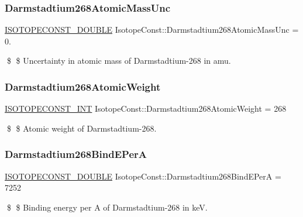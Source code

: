 \subsubsection{\texorpdfstring{Darmstadtium268\+Atomic\+Mass\+Unc}{Darmstadtium268AtomicMassUnc}}
{\footnotesize\ttfamily \mbox{\hyperlink{group___isotope_const-_macros_ga8f45a7272ce02c0b4c65c44636ed719a}{I\+S\+O\+T\+O\+P\+E\+C\+O\+N\+S\+T\+\_\+\+D\+O\+U\+B\+LE}} Isotope\+Const\+::\+Darmstadtium268\+Atomic\+Mass\+Unc = 0.}

\$ \$ Uncertainty in atomic mass of Darmstadtium-\/268 in amu. \mbox{\label{group___isotope_const-_darmstadtium-_ds268_gad6aab6288136e6340f53a201def37b15}} 
\subsubsection{\texorpdfstring{Darmstadtium268\+Atomic\+Weight}{Darmstadtium268AtomicWeight}}
{\footnotesize\ttfamily \mbox{\hyperlink{group___isotope_const-_macros_ga5f18360b3e99483a35c32d789e62621c}{I\+S\+O\+T\+O\+P\+E\+C\+O\+N\+S\+T\+\_\+\+I\+NT}} Isotope\+Const\+::\+Darmstadtium268\+Atomic\+Weight = 268}

\$ \$ Atomic weight of Darmstadtium-\/268. \mbox{\label{group___isotope_const-_darmstadtium-_ds268_ga6ec72a5b686142f3e62e5d8b722d09ce}} 
\subsubsection{\texorpdfstring{Darmstadtium268\+Bind\+E\+PerA}{Darmstadtium268BindEPerA}}
{\footnotesize\ttfamily \mbox{\hyperlink{group___isotope_const-_macros_ga8f45a7272ce02c0b4c65c44636ed719a}{I\+S\+O\+T\+O\+P\+E\+C\+O\+N\+S\+T\+\_\+\+D\+O\+U\+B\+LE}} Isotope\+Const\+::\+Darmstadtium268\+Bind\+E\+PerA = 7252}

\$ \$ Binding energy per A of Darmstadtium-\/268 in keV. \mbox{\label{group___isotope_const-_darmstadtium-_ds268_gaf2bd77b743cb0c51c90ed266e4350efc}} 
